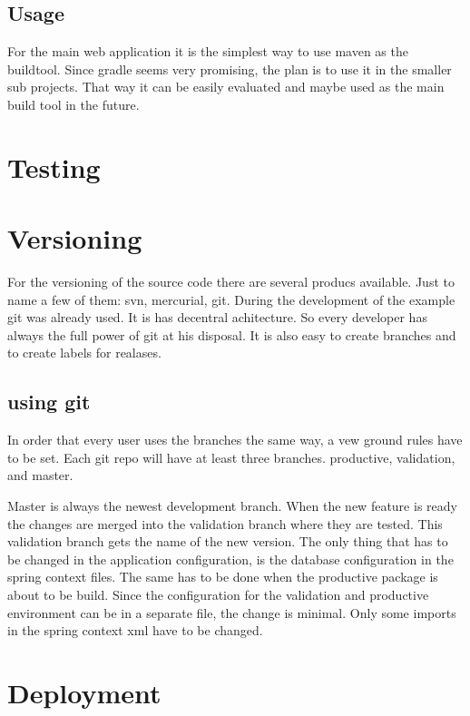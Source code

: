 \documentclass[paper=a4,twoside=false,BCOR=0mm,DIV=calc,fontsize=12pt]{scrartcl}
\begin{document}
\subsection{Usage}
For the main web application it is the simplest way to use maven as the buildtool. Since gradle seems very promising, the plan is to use it in the
smaller sub projects. That way it can be easily evaluated and maybe used as the main build tool in the future.


\section{Testing}

\section{Versioning}
For the versioning of the source code there are several producs available. Just to name a few of them: svn, mercurial, git.
During the development of the example git was already used. It is has decentral achitecture. So every developer has always the full power of git at his disposal. It is also easy to create branches and to create labels for realases.

\subsection{using git}
In order that every user uses the branches the same way, a vew ground rules have to be set.
Each git repo will have at least three branches. productive, validation, and master.

Master is always the newest development branch. When the new feature is ready the changes are merged into the validation branch where they are tested. This validation branch gets the name of the new version.
The only thing that has to be changed in the application configuration, is the database configuration in the spring context files.
The same has to be done when the productive package is about to be build. Since the configuration for the validation and productive 
environment can be in a separate file, the change is minimal. Only some imports in the spring context xml have to be changed.








\section{Deployment}
\end{document}
